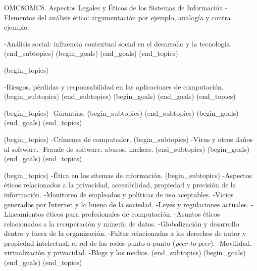 \begin{BKL2}{OMC8}{OMC8. Aspectos Legales y Éticos de los Sistemas de Información}
-Elementos del análisis ético: argumentación por ejemplo, analogía y contra ejemplo.

-Análisis social: influencia contextual social en el desarrollo y la tecnología.
(end_subtopics)
(begin_goals)
(end_goals)
(end_topics)

 

(begin_topics)

-Riesgos, pérdidas y responsabilidad en las aplicaciones de computación.
(begin_subtopics)
(end_subtopics)
(begin_goals)
(end_goals)
(end_topics)

 

(begin_topics)
-Garantías.
(begin_subtopics)
(end_subtopics)
(begin_goals)
(end_goals)
(end_topics)


(begin_topics)
-Crímenes de computador.
(begin_subtopics)
-Virus y otros daños al software.
-Fraude de software, abusos, hackers.
(end_subtopics)
(begin_goals)
(end_goals)
(end_topics)

(begin_topics)
-Ética en los sitemas de información.
(begin_subtopics)
-Aspectos éticos relacionados a la privacidad, accesibilidad, propiedad y precisión de la información.
-Monitoreo de empleados y políticas de uso aceptables.
-Vicios generados por Internet y lo bueno de la sociedad.
-Leyes y regulaciones actuales.
-Lineamientos éticos para profesionales de computación.
-Asuntos éticos relacionados a la recuperación y minería de datos.
-Globalización y desarrollo dentro y fuera de la organización.
-Faltas relacionadas a los derechos de autor y propiedad intelectual, el rol de las redes punto-a-punto (\emph{peer-to-peer}).
-Movilidad, virtualización y privacidad.
-Blogs y los medios.
(end_subtopics)
(begin_goals)
(end_goals)
(end_topics)

\end{BKL2}



